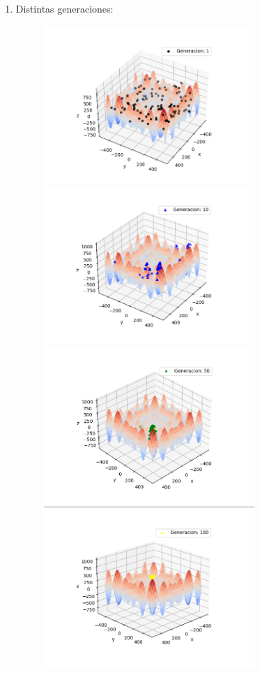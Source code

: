 \documentclass[11pt,letterpaper]{article}
\begin{document}
\begin{enumerate}[label=\alph*)]
\begin{enumerate}[label=\arabic*.]
            \item Distintas generaciones:
            \begin{figure}[H]
                \centering
                \includegraphics[width=8cm]{images/parametros-ajustados/parametros-gen001.png}
                \includegraphics[width=8cm]{images/parametros-ajustados/parametros-gen010.png}
                \includegraphics[width=8cm]{images/parametros-ajustados/parametros-gen050.png}
                \includegraphics[width=8cm]{images/parametros-ajustados/parametros-gen100.png}
                \label{fig:parametros-gen-n}
            \end{figure}
        \end{enumerate}
        

\end{enumerate}
\end{document}
